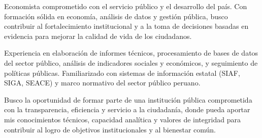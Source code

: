 \par{
	
	Economista comprometido con el servicio público y el desarrollo del país. Con formación sólida en economía, análisis de datos y gestión pública, busco contribuir al fortalecimiento institucional y a la toma de decisiones basadas en evidencia para mejorar la calidad de vida de los ciudadanos.
	
	Experiencia en elaboración de informes técnicos, procesamiento de bases de datos del sector público, análisis de indicadores sociales y económicos, y seguimiento de políticas públicas. Familiarizado con sistemas de información estatal (SIAF, SIGA, SEACE) y marco normativo del sector público peruano.
	
	Busco la oportunidad de formar parte de una institución pública comprometida con la transparencia, eficiencia y servicio a la ciudadanía, donde pueda aportar mis conocimientos técnicos, capacidad analítica y valores de integridad para contribuir al logro de objetivos institucionales y al bienestar común.

	
	

	
}
